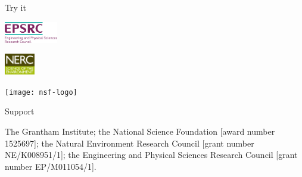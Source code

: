 \documentclass[a0paper,portrait]{baposter}
\begin{document}
\begin{poster}
\begin{posterbox}[name=try, column=3, below=curl-curl,
    span=3, height=0.235]{Try it}
    \vspace{1.5\baselineskip}
    \begin{minipage}{0.167\textwidth}
      \begin{flushleft}
        \includegraphics[align=c,height=2.5em]{epsrc-logo}
      \end{flushleft}
    \end{minipage}
    \hfill
    \begin{minipage}{0.167\textwidth}
      \begin{center}
        \includegraphics[align=c,height=2.5em]{nerc-logo}
      \end{center}
    \end{minipage}
    \hfill
    \begin{minipage}{0.167\textwidth}
      \begin{flushright}
        \texttt{[image: nsf-logo]}
      \end{flushright}
    \end{minipage}
  \end{posterbox}
  \begin{posterbox}[name=acknowledgements,
    column=0,span=6,below=future,boxheaderheight=2em, height=0.075]{Support}
    \begin{flushleft}
      The Grantham Institute; the National Science Foundation [award
      number 1525697]; the Natural Environment Research Council [grant
      number NE/K008951/1]; the Engineering and Physical Sciences
      Research Council [grant number EP/M011054/1].
    \end{flushleft}
  \end{posterbox}
\end{poster}
\end{document}
